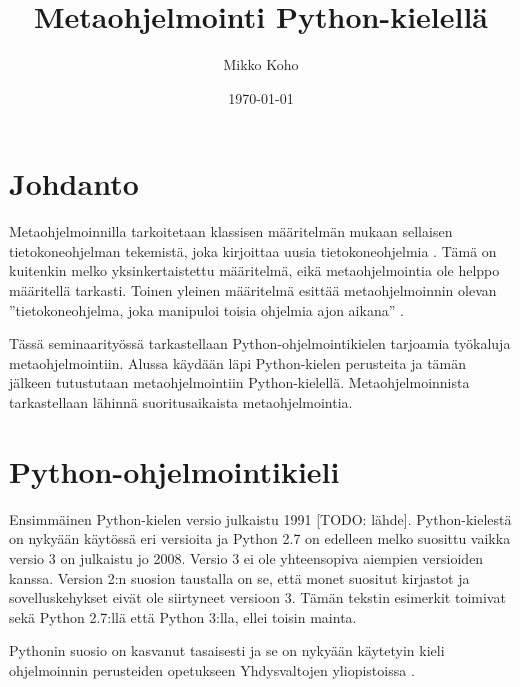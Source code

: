 \documentclass[finnish]{tktltiki2}
\title{Metaohjelmointi Python-kielellä}
\author{Mikko Koho}
\date{\today}
\theoremstyle{definition}
\theoremstyle{remark}
\begin{document}
    

\frontmatter      %

\maketitle        %

\makeabstract     %

\tableofcontents  %


\mainmatter       %


\section{Johdanto}

Metaohjelmoinnilla tarkoitetaan klassisen määritelmän mukaan sellaisen tietokoneohjelman tekemistä, joka kirjoittaa uusia tietokoneohjelmia \cite{hazzard2013}. Tämä on kuitenkin melko yksinkertaistettu määritelmä, eikä metaohjelmointia ole helppo määritellä tarkasti. Toinen yleinen määritelmä esittää metaohjelmoinnin olevan ''tietokoneohjelma, joka manipuloi toisia ohjelmia ajon aikana'' \cite{hazzard2013}.

Tässä seminaarityössä tarkastellaan Python-ohjelmointikielen tarjoamia työkaluja metaohjelmointiin. Alussa käydään läpi Python-kielen perusteita ja tämän jälkeen tutustutaan metaohjelmointiin Python-kielellä. Metaohjelmoinnista tarkastellaan lähinnä suoritusaikaista metaohjelmointia.



\section{Python-ohjelmointikieli}

Ensimmäinen Python-kielen versio julkaistu 1991 [TODO: lähde]. Python-kielestä on nykyään käytössä eri versioita ja Python 2.7 on edelleen melko suosittu vaikka versio 3 on julkaistu jo 2008. Versio 3 ei ole yhteensopiva aiempien versioiden kanssa. Version 2:n suosion taustalla on se, että monet suositut kirjastot ja sovelluskehykset eivät ole siirtyneet versioon 3. Tämän tekstin esimerkit toimivat sekä Python 2.7:llä että Python 3:lla, ellei toisin mainta.

Pythonin suosio on kasvanut tasaisesti ja se on nykyään käytetyin kieli ohjelmoinnin perusteiden opetukseen Yhdysvaltojen yliopistoissa \cite{python-teaching}.
\end{document}
